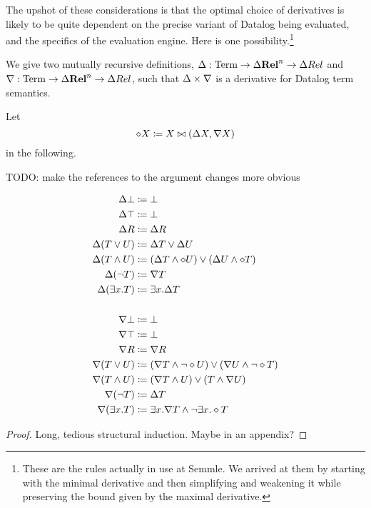 The upshot of these considerations is that the optimal choice of derivatives is likely
to be quite dependent on the precise variant of Datalog being evaluated, and the
specifics of the evaluation engine. Here is one possibility.\footnote{These are
  the rules actually in use at Semmle. We arrived at them by starting with the
  minimal derivative and then simplifying and weakening it while preserving the
  bound given by the maximal derivative.}

\newcommand{\bothdiff}{\diamond}
\begin{thm}
\label{thm:concreteDatalog}
  We give two mutually recursive definitions,
  $\Delta: \mathrm{Term} \rightarrow \Delta \mathbf{Rel}^n \rightarrow \Delta Rel$ and
  $\nabla: \mathrm{Term} \rightarrow \Delta \mathbf{Rel}^n \rightarrow \Delta Rel$, such
  that $\Delta \times \nabla$ is a derivative for Datalog term semantics.

  Let $$\diamond X \coloneqq X \bowtie (\Delta X, \nabla X)$$ in the following.

  TODO: make the references to the argument changes more obvious

  \begin{align*}
  \updiff\bot &\defeq \bot\\
  \updiff\top &\defeq \bot\\
  \updiff R &\defeq \updiff R\\
  \updiff(T\vee U) &\defeq \updiff T \vee \updiff U\\
  \updiff(T\wedge U) &\defeq (\updiff T\wedge \bothdiff U)
                           \vee
                           (\updiff U \wedge \bothdiff T)\\
  \updiff(\neg T) &\defeq \downdiff T\\
  \updiff(\exists x.T) &\defeq \exists x.\updiff T\\
    \\
  \downdiff\bot &\defeq \bot\\
  \downdiff\top &\defeq \bot\\
  \downdiff R &\defeq \downdiff R\\
  \downdiff(T\vee U) &\defeq (\downdiff T \wedge \neg \bothdiff U)
                           \vee
                           (\downdiff U \wedge \neg \bothdiff T)\\
  \downdiff(T\wedge U) &\defeq (\downdiff T\wedge U) \vee (T \wedge \downdiff U)\\
  \downdiff(\neg T) &\defeq \updiff T\\
  \downdiff(\exists x.T) &\defeq \exists x.\downdiff T \wedge \neg \exists x.\bothdiff T
  \end{align*}
\end{thm}
\ifproofs
\begin{proof}
  Long, tedious structural induction. Maybe in an appendix?
\end{proof}
\fi

